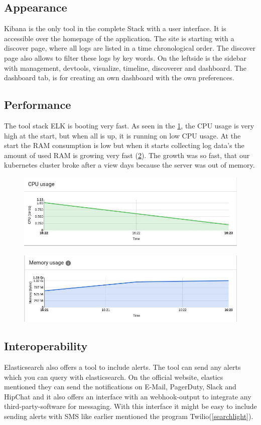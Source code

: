 \subsection{Appearance}%
Kibana is the only tool in the complete Stack with a user interface. It is accessible over the homepage of the application. The site is starting with a discover page, where all logs are listed in a time chronological order. The discover page also allows to filter these logs by key words. On the leftside is the sidebar with management, devtools, visualize, timeline, discoverer and dashboard. The dashboard tab, is for creating an own dashboard with the own preferences.
\subsection{Performance}
The tool stack ELK is booting very fast. As seen in the \cref{fig:ELK_CPU}, the CPU usage is very high at the start, but when all is up, it is running on low CPU usage. At the start the RAM consumption is low but when it starts collecting log data's the amount of used RAM is growing very fast (\cref{fig:ELK_MEM}). The growth was so fast, that our kubernetes cluster broke after a view days because the server was out of memory.
\begin{figure}
	\centering
	\includegraphics[width=0.5\linewidth]{Bilder/Performance/ELK_CPU}
	\caption{}
	\label{fig:ELK_CPU}
\end{figure}
\begin{figure}
	\centering
	\includegraphics[width=0.5\linewidth]{Bilder/Performance/ELK_MEM}
	\caption{}
	\label{fig:ELK_MEM}
\end{figure}
\subsection{Interoperability}
Elasticsearch also offers a tool to include alerts. The tool can send any alerts which you can query with elasticsearch. On the official website, elastics mentioned they can send the notifications on E-Mail, PagerDuty, Slack and HipChat and it also offers an interface with an webhook-output to integrate any third-party-software for messaging. With this interface it might be easy to include sending alerts with SMS like earlier mentioned the program Twilio(\ref{searchlight}).
